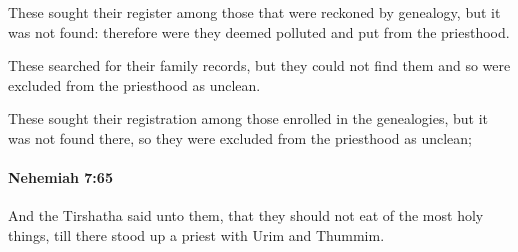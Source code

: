 			\begin{versebox}
					\item[BHS] 
					\item[LXX] 
					\item[ASV] These sought their register among those that were reckoned by genealogy, but it was not found: therefore were they deemed polluted and put from the priesthood.
					\item[NIV] These searched for their family records, but they could not find them and so were excluded from the priesthood as unclean.
					\item[NRSV] These sought their registration among those enrolled in the genealogies, but it was not found there, so they were excluded from the priesthood as unclean;
			\end{versebox}

		\paragraph{Nehemiah 7:65} %
			\label{NEHEMIAH-7-65}

			And the Tirshatha said unto them, that they should not eat of the most holy things, till there stood up a priest with Urim and Thummim.

